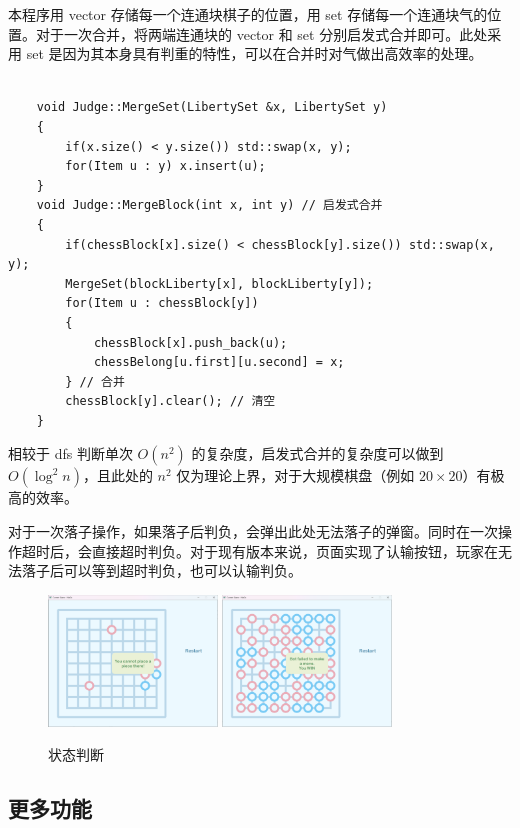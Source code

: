 \documentclass{noithesis}
\begin{document}
	本程序用 vector 存储每一个连通块棋子的位置，用 set 存储每一个连通块气的位置。对于一次合并，将两端连通块的 vector 和 set 分别启发式合并即可。此处采用 set 是因为其本身具有判重的特性，可以在合并时对气做出高效率的处理。
	
	\begin{lstlisting}
		
	void Judge::MergeSet(LibertySet &x, LibertySet y)
	{
		if(x.size() < y.size()) std::swap(x, y);
		for(Item u : y) x.insert(u);
	}
	void Judge::MergeBlock(int x, int y) // 启发式合并
	{
		if(chessBlock[x].size() < chessBlock[y].size()) std::swap(x, y);
		MergeSet(blockLiberty[x], blockLiberty[y]);
		for(Item u : chessBlock[y])
		{
			chessBlock[x].push_back(u);
			chessBelong[u.first][u.second] = x;
		} // 合并
		chessBlock[y].clear(); // 清空
	}
	\end{lstlisting}

	相较于 dfs 判断单次 $O\left(n^2\right)$ 的复杂度，启发式合并的复杂度可以做到 $O\left(\log^2 n\right)$，且此处的 $n^2$ 仅为理论上界，对于大规模棋盘（例如 $20\times 20$）有极高的效率。
	
	对于一次落子操作，如果落子后判负，会弹出此处无法落子的弹窗。同时在一次操作超时后，会直接超时判负。对于现有版本来说，页面实现了认输按钮，玩家在无法落子后可以等到超时判负，也可以认输判负。
	
	\begin{figure}[!htb]{
			\centering
			\includegraphics[width=0.4\textwidth]{img/tip.png}
			\includegraphics[width=0.4\textwidth]{img/win.png}
			\caption{状态判断}
		}
	\end{figure}
	
	\subsection{更多功能}
	
\end{document}
